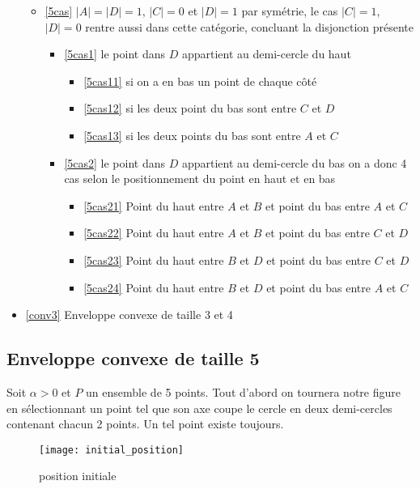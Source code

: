 \begin{itemize}
\begin{itemize}
\begin{itemize}
		\end{itemize}
		\item \ref{5cas} $|A| = |D| = 1$, $|C| = 0$ et $|D| = 1$
		par symétrie, le cas $|C| = 1$, $|D| = 0$ rentre aussi dans cette catégorie, concluant la disjonction présente
		\begin{itemize}
			\item \ref{5cas1} le point dans $D$ appartient au demi-cercle du haut
			\begin{itemize}
				\item \ref{5cas11} si on a en bas un point de chaque côté
				\item \ref{5cas12} si les deux point du bas sont entre $C$ et $D$
				\item \ref{5cas13} si les deux points du bas sont entre $A$ et $C$
			\end{itemize}
			\item \ref{5cas2} le point dans $D$ appartient au demi-cercle du bas
			on a donc 4 cas selon le positionnement du point en haut et en bas
			\begin{itemize}
				\item \ref{5cas21} Point du haut entre $A$ et $B$ et point du bas entre $A$ et $C$
				\item \ref{5cas22} Point du haut entre $A$ et $B$ et point du bas entre $C$ et $D$
				\item \ref{5cas23} Point du haut entre $B$ et $D$ et point du bas entre $C$ et $D$
				\item \ref{5cas24} Point du haut entre $B$ et $D$ et point du bas entre $A$ et $C$
			\end{itemize}
		\end{itemize}
	\end{itemize}
	\item \ref{conv3} Enveloppe convexe de taille 3 et 4
\end{itemize}

\subsection{Enveloppe convexe de taille 5}\label{conv5}

Soit $\alpha > 0$ et $P$ un ensemble de 5 points. Tout d'abord on tournera notre
figure en sélectionnant un point tel que son axe coupe le cercle en deux
demi-cercles contenant chacun 2 points. Un tel point existe toujours.

\begin{figure}[h!]
 \centering
  \texttt{[image: initial\_position]}
 \caption{position initiale}
 \label{fig:initial_position}
\end{figure}

